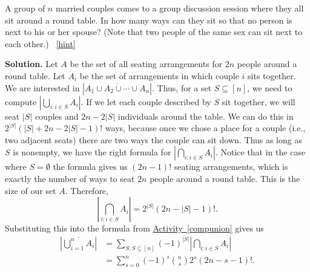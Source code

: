 \documentclass{book}
\begin{document}
\setcounter{project}{226}
\addtocounter{project}{-1}
\begin{activity}[]\label{relaxedmenage}
\hypertarget{p-1274}{}%
A group of \(n\) married couples comes to a group discussion session where they all sit around a round table. In how many ways can they sit so that no person is next to his or her spouse? (Note that two people of the same sex can sit next to each other.)%
~\hfill{\tiny\hyperlink{a-226}{[hint]}\hypertarget{q-226}{}}\par\smallskip%
\noindent\textbf{Solution.}\hypertarget{solution-162}{}\quad%
\hypertarget{p-1277}{}%
Let \(A\) be the set of all seating arrangements for \(2n\) people around a round table. Let \(A_i\) be the set of arrangements in which couple \(i\) sits together. We are interested in \(|\overline{A_1\cup A_2\cup \cdots \cup A_n}|\). Thus, for a set \(S\subseteq [n]\), we need to compute \(\left|\bigcup_{i\colon i\in S} A_i\right|\). If we let each couple described by \(S\) sit together, we will seat \(|S|\) couples and \(2n-2|S|\) individuals around the table. We can do this in \(2^{|S|}(|S| + 2n-2 |S|-1)!\) ways, because once we chose a place for a couple (i.e.\@, two adjacent seats) there are two ways the couple can sit down. Thus as long as \(S\) is nonempty, we have the right formula for \(\left|\bigcap_{i\colon i\in S} A_i\right|\). Notice that in the case where \(S=\emptyset\) the formula gives us \((2n-1)!\) seating arrangements, which is exactly the number of ways to seat \(2n\) people around a round table. This is the size of our set \(A\). Therefore,%
\begin{equation*}
\left|\bigcap_{i\colon i\in S} A_i\right| = 2^{|S|}(2n-|S|-1)!\text{.}
\end{equation*}
Substituting this into the formula from \hyperref[compunion]{Activity~\ref{compunion}} gives us%
\begin{align*}
\left|\overline{\bigcup_{i=1}^n A_i}\right| &=  \sum_{S:S\subseteq [n]}
(-1)^{|S|} \left|\bigcap_{i\colon i\in S} A_i\right|\\
&= \sum_{s=0}^n(-1)^s\binom{n}{s}2^{s}(2n- s-1)!\text{.}
\end{align*}
%
\end{activity}
\end{document}

